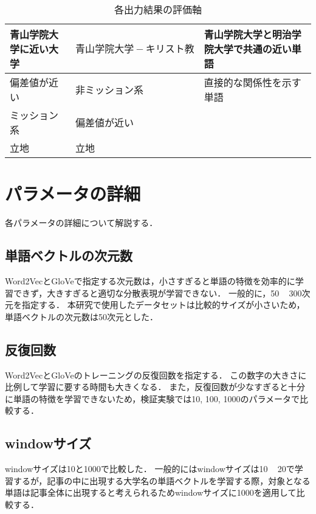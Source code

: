 \begin{table}[htbp]
\caption{各出力結果の評価軸}
\centering
\begin{tabular}{|l|l|l|}
\hline
青山学院大学に近い大学 & $ 青山学院大学 - キリスト教 $ & 青山学院大学と明治学院大学で共通の近い単語
\\ \hline \hline
偏差値が近い& 非ミッション系 & 直接的な関係性を示す単語 \\
ミッション系& 偏差値が近い & \\
立地 & 立地 & \\ \hline
\end{tabular}
\label{table:eval}
\end{table}

\section{パラメータの詳細}
各パラメータの詳細について解説する．

\subsection{単語ベクトルの次元数}
Word2VecとGloVeで指定する次元数は，小さすぎると単語の特徴を効率的に学習できず，大きすぎると適切な分散表現が学習できない．
一般的に，50 ~ 300次元を指定する．
本研究で使用したデータセットは比較的サイズが小さいため，単語ベクトルの次元数は50次元とした．

\subsection{反復回数}
Word2VecとGloVeのトレーニングの反復回数を指定する．
この数字の大きさに比例して学習に要する時間も大きくなる．
また，反復回数が少なすぎると十分に単語の特徴を学習できないため，検証実験では10, 100, 1000のパラメータで比較する．

\subsection{windowサイズ}
windowサイズは10と1000で比較した．
一般的にはwindowサイズは10 ~ 20で学習するが，記事の中に出現する大学名の単語ベクトルを学習する際，対象となる単語は記事全体に出現すると考えられるためwindowサイズに1000を適用して比較する．

